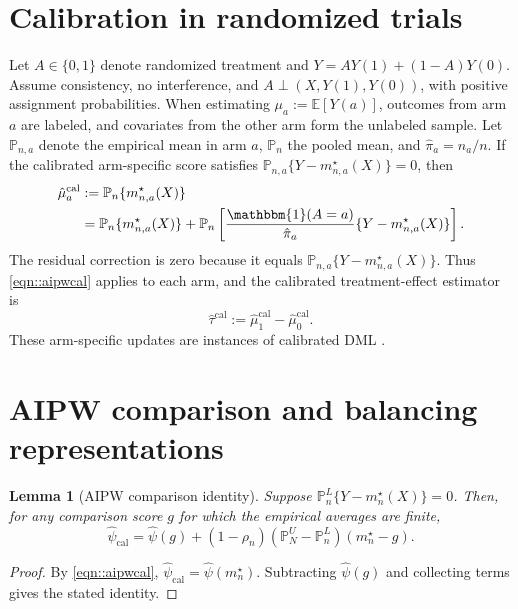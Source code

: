 \documentclass{article}
\theoremstyle{plain}
\newtheorem{lemma}{Lemma}
\theoremstyle{definition}
\newcommand{\E}{\mathbb{E}}
\newcommand{\1}{\mathbbm{1}}
\newcommand{\psihat}{\widehat{\psi}_{\mathrm{cal}}}
\newcommand{\rhon}{\rho_n}
\newcommand{\Pl}{\mathbb{P}^{L}_n}
\newcommand{\Pu}{\mathbb{P}^{U}_N}
\begin{document}
\section{Calibration in randomized trials}
\label{app:causal}

Let \(A\in\{0,1\}\) denote randomized treatment and
\(Y=AY(1)+(1-A)Y(0)\). Assume consistency, no interference, and
\(A\perp(X,Y(1),Y(0))\), with positive assignment probabilities.
When estimating \(\mu_a:=\E[Y(a)]\), outcomes from arm \(a\) are labeled,
and covariates from the other arm form the unlabeled sample.
Let \(\mathbb P_{n,a}\) denote the empirical mean in arm \(a\),
\(\mathbb P_n\) the pooled mean, and \(\hat\pi_a=n_a/n\).
If the calibrated arm-specific score satisfies
\(\mathbb P_{n,a}\{Y-m_{n,a}^\star(X)\}=0\), then
\begin{align}
\hat\mu_a^{\mathrm{cal}}
&:=\mathbb P_n\{m_{n,a}^\star(X)\}\label{eq:rct-mua-plugin}\\
&=\mathbb P_n\{m_{n,a}^\star(X)\}
+\mathbb P_n\left[
\frac{\1(A=a)}{\hat\pi_a}\{Y-m_{n,a}^\star(X)\}
\right].\label{eq:rct-mua-aipw}
\end{align}
The residual correction is zero because it equals
\(\mathbb P_{n,a}\{Y-m_{n,a}^\star(X)\}\).
Thus \eqref{eqn::aipwcal} applies to each arm, and the calibrated
treatment-effect estimator is
\begin{equation}
\label{eq:rct-ate}
\hat\tau^{\mathrm{cal}}:=\hat\mu_1^{\mathrm{cal}}-\hat\mu_0^{\mathrm{cal}}.
\end{equation}
These arm-specific updates are instances of calibrated DML
\citep{van2024automatic}.

\section{AIPW comparison and balancing representations}
\label{app:repr}

\begin{lemma}[AIPW comparison identity]
\label{lem:aipw-comparison}
Suppose \(\Pl\{Y-m_n^\star(X)\}=0\).
Then, for any comparison score \(g\) for which the empirical averages are finite,
\[
\psihat
=
\widehat\psi(g)
+(1-\rhon)(\Pu-\Pl)(m_n^\star-g).
\]
\end{lemma}

\begin{proof}
By \eqref{eqn::aipwcal}, \(\psihat=\widehat\psi(m_n^\star)\).
Subtracting \(\widehat\psi(g)\) and collecting terms gives the stated identity.
\end{proof}
\end{document}
